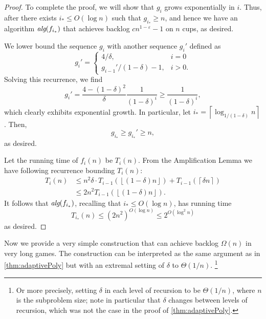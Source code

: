 \documentclass[twocolumn]{article}[10pt]
\newcommand{\alg}[1]{\textit{\text{alg}}({#1})}
\newcommand{\floor}[1]{\left\lfloor #1 \right\rfloor}
\newcommand{\ceil}[1]{\left\lceil #1 \right\rceil}
\begin{document}
\begin{proof}
  To complete the proof, we will show that $g_i$ grows exponentially in $i$. Thus,
  after there exists $i_* \le O(\log n)$ such that
  $g_{i_*} \ge n$, and hence we have an algorithm $\alg{f_{i_*}}$
  that achieves backlog $cn^{1-\varepsilon}-1$ on $n$ cups, as
  desired.
  
  We lower bound the sequence $g_i$ with another sequence $g_i'$
  defined as 
  $$g_i'=\begin{cases}
    4/\delta, & i=0\\
    g_{i-1}' / (1-\delta) -1, & i> 0.
  \end{cases}$$
  Solving this recurrence, we find 
  $$g_i' = \frac{4-(1-\delta)^2}{\delta} \frac{1}{(1-\delta)^i}
  \ge \frac{1}{(1-\delta)^i},$$
  which clearly exhibits exponential growth. 
  In particular, let $i_* = \ceil{\log_{1/(1-\delta)} n}$. Then,
  $$ g_{i_*} \ge g_{i_*}' \ge n,$$ as desired.

  Let the running time of $f_i(n)$ be $T_i(n)$. From the Amplification Lemma we have following recurrence bounding $T_i(n)$:
  \begin{align*}
  T_i(n) &\le n^2\delta \cdot T_{i-1}(\floor{(1-\delta)n}) +
  T_{i-1}(\ceil{\delta n}) \\
  &\le 2n^2T_{i-1}(\floor{(1-\delta)n}).
  \end{align*}
  It follows that $\alg{f_{i_*}}$, recalling that $i_* \le O(\log n)$, has running time
  $$T_{i_*}(n) \le (2n^2)^{O(\log n)} \le 2^{O(\log^2 n)}$$
  as desired.

\end{proof}

Now we provide a very simple construction that can achieve backlog $\Omega(n)$
in very long games. The construction can be interpreted as the same
argument as in \cref{thm:adaptivePoly} but with an extremal setting of
$\delta$ to $\Theta(1/n)$. \footnote{Or more precisely, setting
$\delta$ in each level of recursion to be $\Theta(1 / n)$, where
$n$ is the subproblem size; note in particular that $\delta$
changes between levels of recursion, which was not the case in
the proof of \cref{thm:adaptivePoly}.}
\end{document}
